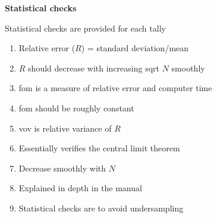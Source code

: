 \documentclass[aspectratio=1610,pdftex,dvipsnames,compress,xcolor={dvipsnames}]{beamer}
\newcommand{\acf}{\acrfull} %
\newcommand{\acs}{\acrshort} %
\begin{document}
\begin{frame}[plain]{}
    \centering\LARGE\textbf{Statistical checks}
\end{frame}


\addtocounter{framenumber}{-1} 
\begin{frame}{Statistical checks are provided for each tally}
    \begin{enumerate}[series=outerlist,topsep=0pt,itemsep=5pt,leftmargin=*,label=(\arabic*)]
        \item[]Relative error ($R$) = standard deviation/mean
        \item[]$R$ should decrease with increasing sqrt $N$ smoothly
            \vspace{0.15in}
        \item[]\acs{fom} is a measure of relative error and computer time
        \item[]\acs{fom} should be roughly constant
            \vspace{0.15in}
        \item[]\acf{vov} is relative variance of $R$
        \item[]Essentially verifies the central limit theorem
        \item[]Decrease smoothly with $N$
        \item[]Explained in depth in the manual
            \vspace{0.15in}
        \item[]Statistical checks are to avoid undersampling
    \end{enumerate}
\end{frame}
\end{document}
